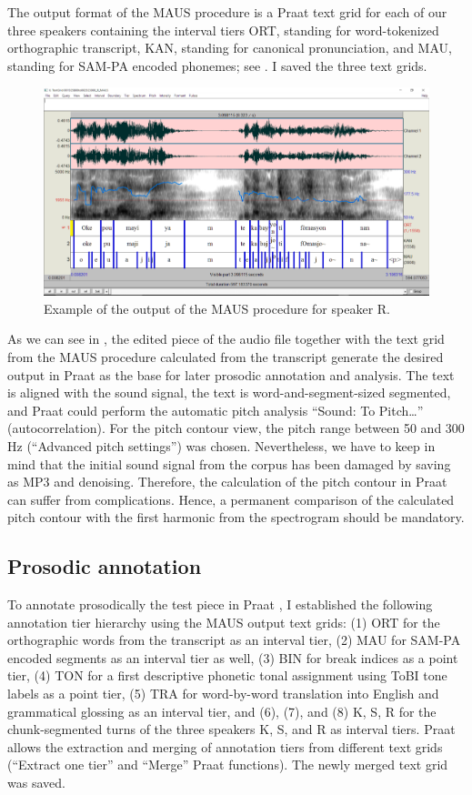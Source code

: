 \documentclass[output=paper]{langsci/langscibook}
\begin{document}
The output format of the MAUS procedure is a Praat text grid for each of our three speakers containing the interval tiers ORT, standing for word-tokenized orthographic transcript, KAN, standing for canonical pronunciation, and MAU, standing for SAM-PA encoded phonemes; see . I saved the three text grids.

\begin{figure}  
\includegraphics[width=\textwidth]{figures/KALPeerreviewedkorr-img2.png}
\caption{\label{fig:kal:2} Example of the output of the MAUS procedure for speaker R.}
\end{figure}


As we can see in , the edited piece of the audio file together with the text grid from the MAUS procedure calculated from the transcript generate the desired output in Praat as the base for later prosodic annotation and analysis. The text is aligned with the sound signal, the text is word-and-segment-sized segmented, and Praat could perform the automatic pitch analysis “Sound: To Pitch…” (autocorrelation). For the pitch contour view, the pitch range between 50 and 300 Hz (“Advanced pitch settings”) was chosen. Nevertheless, we have to keep in mind that the initial sound signal from the corpus has been damaged by saving as MP3 and denoising. Therefore, the calculation of the pitch contour in Praat can suffer from complications. Hence, a permanent comparison of the calculated pitch contour with the first harmonic from the spectrogram should be mandatory.

\subsection{Prosodic annotation}
To annotate prosodically the test piece in Praat \citep{Boersma.praat}, I established the following annotation tier hierarchy using the MAUS output text grids: (1) ORT for the orthographic words from the transcript as an interval tier, (2) MAU for SAM-PA encoded segments as an interval tier as well, (3) BIN for break indices as a point tier, (4) TON for a first descriptive phonetic tonal assignment using ToBI tone labels as a point tier, (5) TRA for word-by-word translation into English and grammatical glossing as an interval tier, and (6), (7), and (8) K, S, R for the chunk-segmented turns of the three speakers K, S, and R as interval tiers. Praat allows the extraction and merging of annotation tiers from different text grids (“Extract one tier” and “Merge” Praat functions). The newly merged text grid was saved.
\end{document}
